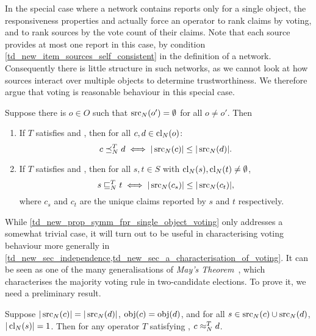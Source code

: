 In the special case where a network contains reports only for a single object,
the responsiveness properties and \symmetry{} actually force an operator to
rank claims by voting, and to rank sources by the vote count of their claims.
Note that each source provides at most one report in this case, by condition
\cref{td_new_item_sources_self_consistent} in the definition of a network.
Consequently there is little structure in such networks, as we cannot look at
how sources interact over multiple objects to determine trustworthiness. We
therefore argue that voting is reasonable behaviour in this special case.

\begin{proposition}
    \label{td_new_prop_symm_fpr_single_object_voting}
    Suppose there is $o \in O$ such that $\operatorname{src}_N(o') = \emptyset$ for all $o
    \ne o'$. Then
    \begin{enumerate}
        \item\label{td_new_item_prop_symm_fpr_single_object_voting_claims}
        If $T$ satisfies \symmetry{} and \freshposresp{}, then for all $c, d
            \in \operatorname{cl}_N(o)$:
        \[
            c \preceq_N^T d \iff |\operatorname{src}_N(c)| \le |\operatorname{src}_N(d)|.
        \]
        \item\label{td_new_item_prop_symm_fpr_single_object_voting_sources}
        If $T$ satisfies \symmetry{} and \sourceposresp{}, then for all $s, t
            \in S$ with $\operatorname{cl}_N(s), \operatorname{cl}_N(t) \ne \emptyset$,
        \[
            s \sqsubseteq_N^T t
            \iff
            |\operatorname{src}_N(c_s)| \le |\operatorname{src}_N(c_t)|,
        \]
        where $c_s$ and $c_t$ are the unique claims reported by $s$ and $t$
        respectively.
    \end{enumerate}
\end{proposition}

While \cref{td_new_prop_symm_fpr_single_object_voting} only addresses a
somewhat trivial case, it will turn out to be useful in characterising voting
behaviour more generally in
\cref{td_new_sec_independence,td_new_sec_a_characterisation_of_voting}. It can
be seen as one of the many generalisations of \emph{May's
Theorem}~\cite{may1952set}, which characterises the majority voting rule in
two-candidate elections.
%
To prove it, we need a preliminary result.

\begin{lemma}
    \label{td_new_lemma_symm_equal_sources_one_claim}
    Suppose $|\operatorname{src}_N(c)| = |\operatorname{src}_N(d)|$, $\operatorname{obj}(c) = \operatorname{obj}(d)$, and for all $s
    \in \operatorname{src}_N(c) \cup \operatorname{src}_N(d)$, $|\operatorname{cl}_N(s)| = 1$. Then for any operator
    $T$ satisfying \symmetry{}, $c \approx_N^T d$.
\end{lemma}

